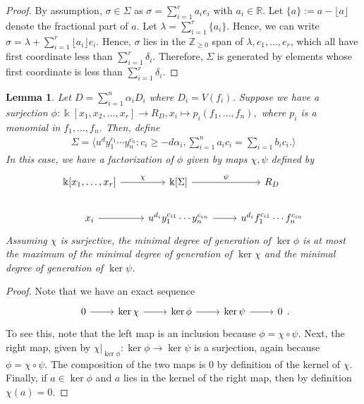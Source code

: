 \documentclass{amsart}
\theoremstyle{plain}
\newtheorem{lem}[thm]{Lemma}
\theoremstyle{definition}
\theoremstyle{remark}
\numberwithin{equation}{section}
\newcommand\br{{\mathbb R}}
\newcommand\bz{{\mathbb Z}}
\newcommand\bk{{\Bbbk}}
\newcommand\bida{a}
\newcommand\bidb{b}
\newcommand\pdeg{\delta}
\begin{document}
\begin{proof}
\todo{define $\pdeg$, $\bida$, and $\bidb$}
By assumption, $\sigma \in \Sigma$ as $\sigma = \sum_{i=1}^{r} \bida_i e_i$ with $\bida_i \in \br$. Let $\{a\} := a - \lfloor a \rfloor$ denote the fractional part of $a$. Let $\lambda = \sum_{i=1}^{r}\{\bida_i\}$. Hence, we can write $\sigma = \lambda + \sum_{i=1}^{r}\lfloor \bida_i \rfloor e_i.$ Hence, $\sigma$ lies in the $\bz_{\geq 0}$ span of $\lambda, e_1,\ldots, e_r$, which all have first coordinate less than $\sum_{i=1}^{r}\pdeg_i$. Therefore, $\Sigma$ is generated by elements whose first coordinate is less than $\sum_{i=1}^{r}\pdeg_i$.
\end{proof}

\begin{lem}
\label{lem:composite-map}
Let $D = \sum_{i=1}^{n}\alpha_i D_i$ where $D_i = V(f_i)$. Suppose we have a surjection $\phi: \bk[x_1,x_2,\ldots, x_r] \rightarrow R_D, x_i \mapsto p_i(f_1, \ldots, f_n),$ where $p_i$ is a monomial in $f_1,\ldots, f_n$. Then, define
\begin{align*}
	\Sigma = \langle u^d y_1^{c_1} \cdots y_n^{c_n} : c_i \geq -d \alpha_i, \sum_{i=1}^{n} \bida_i c_i = \sum_{i=1}^{} \bidb_i c_i. \rangle 
\end{align*}
In this case, we have a factorization of $\phi$ given by maps $\chi, \psi$ defined by
$$\begin{tikzcd}
\bk[x_1,\ldots, x_r] \ar {r}{\chi} & \bk[\Sigma] \ar {r}{\psi} & R_D \\
x_i \ar r & u^{d_i}y_1^{c_{i1}} \cdots y_n^{c_{in}} \ar r & u^{d_i}f_1^{c_{i1}} \cdots f_n^{c_{in}}
\end{tikzcd}$$
Assuming $\chi$ is surjective, the minimal degree of generation of $\ker \phi$ is at most the maximum of the minimal degree of generation of $\ker \chi$ and the minimal degree of generation of $\ker \psi$.
\end{lem}
\begin{proof}
Note that we have an exact sequence
$$\begin{tikzcd}
0 \ar r & \ker \chi \ar r & \ker \phi \ar r & \ker \psi \ar r & 0
\end{tikzcd}.$$
To see this, note that the left map is an inclusion because $\phi = \chi \circ \psi$. Next, the right map, given by $\chi|_{\ker \phi}:\ker \phi \rightarrow \ker \psi$ is a surjection, again because $\phi = \chi \circ \psi$. The composition of the two maps is $0$ by definition of the kernel of $\chi$. Finally, if $a \in \ker \phi$ and $a$ lies in the kernel of the right map, then by definition $\chi(a) = 0$.
\end{proof}
\end{document}
